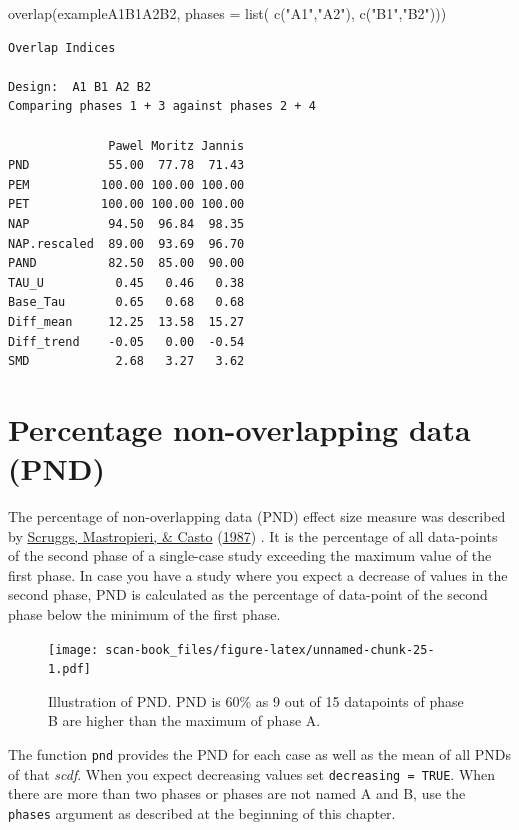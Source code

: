\documentclass[
]{book}
\newenvironment{Shaded}{\begin{snugshade}}{\end{snugshade}}
\newcommand{\AttributeTok}[1]{\textcolor[rgb]{0.77,0.63,0.00}{#1}}
\newcommand{\FunctionTok}[1]{\textcolor[rgb]{0.00,0.00,0.00}{#1}}
\newcommand{\NormalTok}[1]{#1}
\newcommand{\StringTok}[1]{\textcolor[rgb]{0.31,0.60,0.02}{#1}}
\begin{document}
\begin{Shaded}
\begin{Highlighting}[]
\FunctionTok{overlap}\NormalTok{(exampleA1B1A2B2, }\AttributeTok{phases =} \FunctionTok{list}\NormalTok{( }\FunctionTok{c}\NormalTok{(}\StringTok{"A1"}\NormalTok{,}\StringTok{"A2"}\NormalTok{), }\FunctionTok{c}\NormalTok{(}\StringTok{"B1"}\NormalTok{,}\StringTok{"B2"}\NormalTok{)))}
\end{Highlighting}
\end{Shaded}

\begin{verbatim}
Overlap Indices

Design:  A1 B1 A2 B2 
Comparing phases 1 + 3 against phases 2 + 4 

              Pawel Moritz Jannis
PND           55.00  77.78  71.43
PEM          100.00 100.00 100.00
PET          100.00 100.00 100.00
NAP           94.50  96.84  98.35
NAP.rescaled  89.00  93.69  96.70
PAND          82.50  85.00  90.00
TAU_U          0.45   0.46   0.38
Base_Tau       0.65   0.68   0.68
Diff_mean     12.25  13.58  15.27
Diff_trend    -0.05   0.00  -0.54
SMD            2.68   3.27   3.62
\end{verbatim}

\hypertarget{percentage-non-overlapping-data-pnd}{%
\section{Percentage non-overlapping data (PND)}\label{percentage-non-overlapping-data-pnd}}

The percentage of non-overlapping data (PND) effect size measure was described by \protect\hyperlink{ref-scruggs_quantitative_1987}{Scruggs, Mastropieri, \& Casto} (\protect\hyperlink{ref-scruggs_quantitative_1987}{1987}) . It is the percentage of all data-points of the second phase of a single-case study exceeding the maximum value of the first phase. In case you have a study where you expect a decrease of values in the second phase, PND is calculated as the percentage of data-point of the second phase below the minimum of the first phase.

\begin{figure}
\centering
\texttt{[image: scan-book\_files/figure-latex/unnamed-chunk-25-1.pdf]}
\caption{\label{fig:unnamed-chunk-25}Illustration of PND. PND is 60\% as 9 out of 15 datapoints of phase B are higher than the maximum of phase A.}
\end{figure}

The function \texttt{pnd} provides the PND for each case as well as the mean of all PNDs of that \emph{scdf}. When you expect decreasing values set \texttt{decreasing\ =\ TRUE}. When there are more than two phases or phases are not named A and B, use the \texttt{phases} argument as described at the beginning of this chapter.
\end{document}
